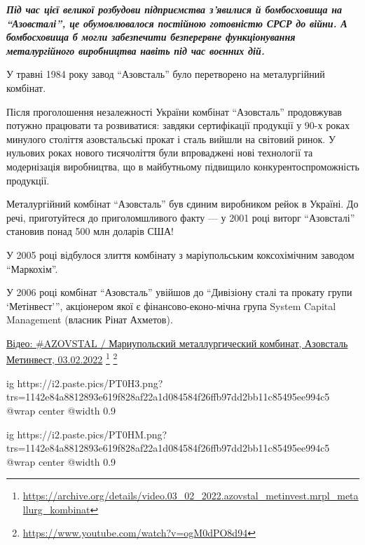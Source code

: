\begin{leftbar}
\em\bfseries Під час цієї великої розбудови підприємства з'явилися й бомбосховища на
\enquote{Азовсталі}, це обумовлювалося постійною готовністю СРСР до війни. А
бомбосховища б могли забезпечити безперервне функціонування металургійного
виробництва навіть під час воєнних дій.
\end{leftbar}

У травні 1984 року завод \enquote{Азовсталь} було перетворено на металургійний
комбінат.

Після проголошення незалежності України комбінат \enquote{Азовсталь} продовжував
потужно працювати та розвиватися: завдяки сертифікації продукції у 90-х роках
минулого століття азовстальські прокат і сталь вийшли на світовий ринок. У
нульових роках нового тисячоліття були впроваджені нові технології та
модернізація виробництва, що в майбутньому підвищило конкурентоспроможність
продукції.

Металургійний комбінат \enquote{Азовсталь} був єдиним виробником рейок в Україні. До
речі, приготуйтеся до приголомшливого факту — у 2001 році виторг \enquote{Азовсталі}
становив понад 500 млн доларів США!

У 2005 році відбулося злиття комбінату з маріупольським коксохімічним заводом
\enquote{Маркохім}.

У 2006 році комбінат \enquote{Азовсталь} увійшов до \enquote{Дивізіону сталі та прокату групи
\enquote{Метінвест}}, акціонером якої є фінансово-еконо\hyp{}мічна група System Capital
Management (власник Рінат Ахметов).

\href{https://archive.org/details/video.03_02_2022.azovstal_metinvest.mrpl_metallurg_kombinat}{%
Відео: \#AZOVSTAL / Мариупольский металлургический комбинат, Азовсталь Метинвест, 03.02.2022}%
\footnote{\url{https://archive.org/details/video.03_02_2022.azovstal_metinvest.mrpl_metallurg_kombinat}} %
\footnote{\url{https://www.youtube.com/watch?v=ogM0dPO8d94}}

\ifcmt
  ig https://i2.paste.pics/PT0H3.png?trs=1142e84a8812893e619f828af22a1d084584f26ffb97dd2bb11c85495ee994c5
  @wrap center
  @width 0.9
\fi

\ifcmt
  ig https://i2.paste.pics/PT0HM.png?trs=1142e84a8812893e619f828af22a1d084584f26ffb97dd2bb11c85495ee994c5
  @wrap center
  @width 0.9
\fi

